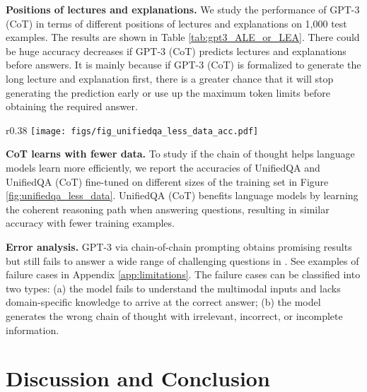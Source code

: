 \textbf{Positions of lectures and explanations.} We study the performance of GPT-3 (CoT) in terms of different positions of lectures and explanations on 1,000 test examples. The results are shown in Table  \ref{tab:gpt3_ALE_or_LEA}. There could be huge accuracy decreases if GPT-3 (CoT) predicts lectures and explanations before answers. It is mainly because if GPT-3 (CoT) is formalized to generate the long lecture and explanation first, there is a greater chance that it will stop generating the prediction early or use up the maximum token limits before obtaining the required answer.

\begin{wrapfigure}{r}{0.38\textwidth}
\centering
 \vspace{-4.5mm}
 \texttt{[image: figs/fig\_unifiedqa\_less\_data\_acc.pdf]}
 \caption{UnifiedQA (CoT) learns efficiently with fewer training examples.}
 \vspace{-6.0mm}
 \label{fig:unifiedqa_less_data}
\end{wrapfigure}


\textbf{CoT learns with fewer data.}  To study if the chain of thought helps language models learn more efficiently, we report the accuracies of UnifiedQA and UnifiedQA (CoT) fine-tuned on different sizes of the training set in Figure \ref{fig:unifiedqa_less_data}. UnifiedQA (CoT) benefits language models by learning the coherent reasoning path when answering questions, resulting in similar accuracy with fewer training examples.

\textbf{Error analysis.} GPT-3 via chain-of-chain prompting obtains promising results but still fails to answer a wide range of challenging questions in \name{}. See examples of failure cases in Appendix \ref{app:limitations}. The failure cases can be classified into two types: (a) the model fails to understand the multimodal inputs and lacks domain-specific knowledge to arrive at the correct answer; (b) the model generates the wrong chain of thought with irrelevant, incorrect, or incomplete information.


\vspace{-2mm}
\section{Discussion and Conclusion}
\vspace{-2mm}

